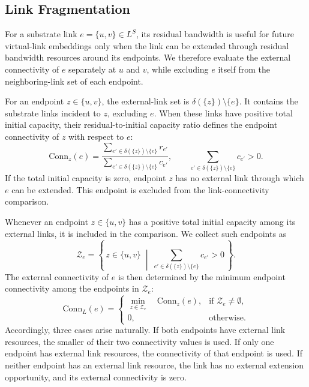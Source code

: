 \documentclass{ieeeaccess}
\begin{document}
\subsection{Link Fragmentation}

For a substrate link $e=\{u,v\}\in L^S$, its residual bandwidth is useful
for future virtual-link embeddings only when the link can be extended
through residual bandwidth resources around its endpoints. We therefore
evaluate the external connectivity of $e$ separately at $u$ and $v$, while
excluding $e$ itself from the neighboring-link set of each endpoint.

For an endpoint $z\in\{u,v\}$, the external-link set is
$\delta(\{z\})\setminus\{e\}$. It contains the substrate links incident to $z$, excluding $e$.
When these links have positive total initial capacity, their residual-to-initial capacity ratio
defines the endpoint connectivity of $z$ with respect to $e$:
\begin{equation}
	\mathrm{Conn}_z(e)
	=
	\frac{\sum_{e'\in\delta(\{z\})\setminus\{e\}}r_{e'}}
	{\sum_{e'\in\delta(\{z\})\setminus\{e\}}c_{e'}},
	\qquad
	\sum_{e'\in\delta(\{z\})\setminus\{e\}}c_{e'}>0.
	\label{eq:conn_endpoint}
\end{equation}
If the total initial capacity is zero, endpoint $z$ has no external link through which $e$ can be
extended. This endpoint is excluded from the link-connectivity comparison.

Whenever an endpoint $z \in \{u, v\}$ has a positive total initial capacity
among its external links, it is included in the comparison. We collect such
endpoints as
\begin{equation}
	\mathcal{Z}_e
	=
	\left\{\, z \in \{u,v\} \;\middle|\;
	\sum_{e' \in \delta(\{z\}) \setminus \{e\}} c_{e'} > 0 \,\right\}.
	\label{eq:zset}
\end{equation}
The external connectivity of $e$ is then determined by the minimum
endpoint connectivity among the endpoints in $\mathcal{Z}_e$:
\begin{equation}
	\mathrm{Conn}_L(e) =
	\begin{cases}
		\displaystyle \min_{z \in \mathcal{Z}_e} \quad \mathrm{Conn}_z(e), & \text{if } \mathcal{Z}_e \neq \emptyset, \\[1.5ex]
		0,                                                                 & \text{otherwise.}                        
	\end{cases}
	\label{eq:conn_l}
\end{equation}
Accordingly, three cases arise naturally. If both endpoints have external link resources, the
smaller of their two connectivity values is used. If only one endpoint has external link
resources, the connectivity of that endpoint is used. If neither endpoint has an external link
resource, the link has no external extension opportunity, and its external connectivity is zero.
\end{document}

